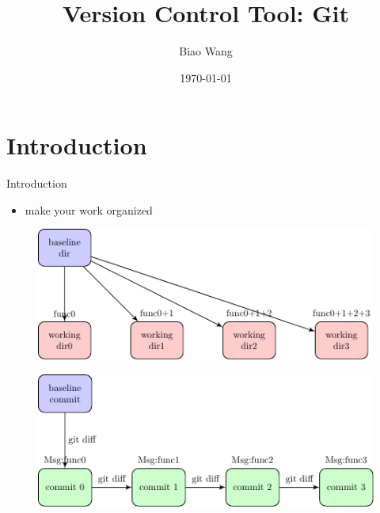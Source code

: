 \documentclass{beamer}
\title[]{Version Control Tool: Git}
\author{Biao Wang}
\institute{Anacode}
\date{\today}
\begin{document}
\begin{frame}
  \titlepage
\end{frame}


\section{Introduction}
\begin{frame}{Introduction}
    \begin{itemize}
      \item make your work organized      
    \end{itemize}  
    \begin{figure}
      \includegraphics[width=.7\textwidth]{figures/withoutversioncontrol.pdf}      
    \end{figure}
    \begin{figure}
      \includegraphics[width=.7\textwidth]{figures/withversioncontrol.pdf}
    \end{figure}         
\end{frame}
\end{document}

